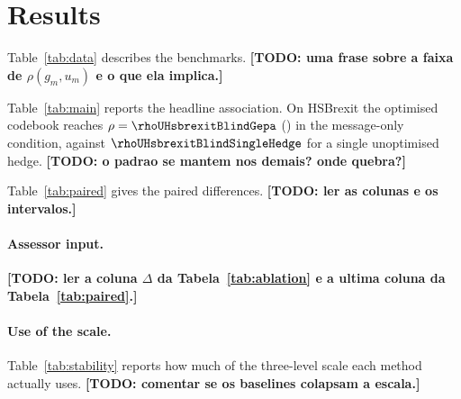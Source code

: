 \section{Results}

Table~\ref{tab:data} describes the benchmarks. \textbf{[TODO: uma frase sobre a faixa de $\rho(g_m,u_m)$ e o que ela implica.]}



Table~\ref{tab:main} reports the headline association. On HSBrexit the optimised codebook reaches $\rho = \rhoUHsbrexitBlindGepa$ (\ciUHsbrexitBlindGepa) in the message-only condition, against $\rhoUHsbrexitBlindSingleHedge$ for a single unoptimised hedge. \textbf{[TODO: o padrao se mantem nos demais? onde quebra?]}



Table~\ref{tab:paired} gives the paired differences. \textbf{[TODO: ler as colunas e os intervalos.]}



\paragraph{Assessor input.} \textbf{[TODO: ler a coluna $\Delta$ da Tabela~\ref{tab:ablation} e a ultima coluna da Tabela~\ref{tab:paired}.]}



\paragraph{Use of the scale.} Table~\ref{tab:stability} reports how much of the three-level scale each method actually uses. \textbf{[TODO: comentar se os baselines colapsam a escala.]}

